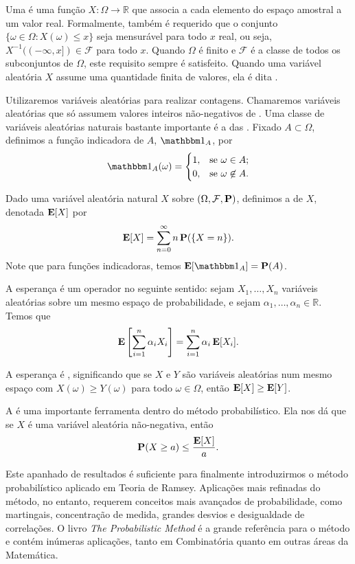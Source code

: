 Uma  é uma função $X: \Omega \to \mathbb{R}$ que associa a cada elemento do espaço amostral a um valor real. Formalmente, também é requerido que o conjunto $\{ \omega \in \Omega : X(\omega) \leq x \}$ seja mensurável para todo $x$ real, ou seja, $X^{-1}( (-\infty,x]) \in \mathcal{F}$ para todo $x$. Quando $\Omega$ é finito e $\mathcal{F}$ é a classe de todos os subconjuntos de $\Omega$, este requisito sempre é satisfeito. Quando uma variável aleatória $X$ assume uma quantidade finita de valores, ela é dita .

Utilizaremos variáveis aleatórias para realizar contagens. Chamaremos  variáveis aleatórias que só assumem valores inteiros não-negativos de . Uma classe de variáveis aleatórias naturais bastante importante é a das . Fixado $A \subset \Omega$, definimos a função indicadora de $A$, $\ind{A}$, por
\[ \ind{A}(\omega) = \begin{cases}
  1, & \text{se } \omega \in A; \\
  0, & \text{se } \omega \not\in A.
\end{cases}\]

Dado uma variável aleatória natural $X$ sobre $(\Omega, \mathcal{F}, \operatorname{\mathbf{P}})$, definimos a  de $X$, denotada $\operatorname{\mathbf{E}}[X]$ por
\[ \operatorname{\mathbf{E}}[X] = \sum_{n = 0}^{\infty} n \operatorname{\mathbf{P}}(\{X = n\}).\]
Note que para funções indicadoras, temos $\expec[\ind{A}] = \prob(A)$.

A esperança é um operador  no seguinte sentido: sejam $X_1, \dots, X_n$ variáveis aleatórias sobre um mesmo espaço de probabilidade, e sejam $\alpha_1, \dots, \alpha_n \in \mathbb{R}$. Temos que
\[ \operatorname{\mathbf{E}}\left[ \sum_{i=1}^n \alpha_i X_i \right] = \sum_{i = 1}^{n} \alpha_i \operatorname{\mathbf{E}}[X_i]. \]

A esperança é , significando que se $X$ e $Y$ são variáveis aleatórias num mesmo espaço com $X(\omega) \geq Y(\omega)$ para todo $\omega \in \Omega$, então $\operatorname{\mathbf{E}}[X] \geq \operatorname{\mathbf{E}}[Y]$.

A  é uma importante ferramenta dentro do método probabilístico. Ela nos dá que se $X$ é uma variável aleatória não-negativa, então
\[ \operatorname{\mathbf{P}}(X \geq a) \leq \frac{\operatorname{\mathbf{E}}[X]}{a}. \]

Este apanhado de resultados é suficiente para finalmente introduzirmos o método probabilístico aplicado em Teoria de Ramsey. Aplicações mais refinadas do método, no entanto, requerem conceitos mais avançados de probabilidade, como martingais, concentração de medida, grandes desvios e desigualdade de correlações. O livro \emph{The Probabilistic Method} \cite{alon} é a grande referência para o método e contém inúmeras aplicações, tanto em Combinatória quanto em outras áreas da Matemática.

